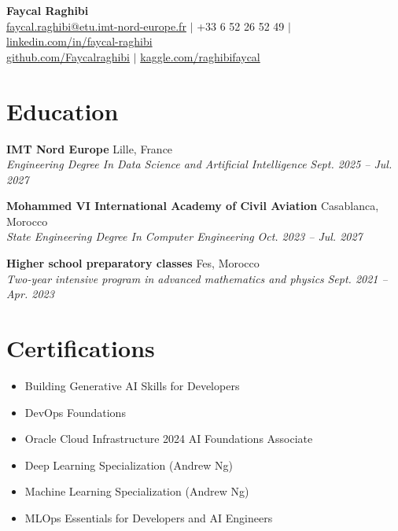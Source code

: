 \documentclass[11pt,a4paper]{article}
\newcommand{\resumeItem}[1]{\item\small{#1}}
\newcommand{\resumeSubheading}[4]{
  \vspace{1pt}
  \noindent\textbf{#1} \hfill #2 \\
  \textit{#3} \hfill \textit{#4}
  \vspace{0pt}
}
\begin{document}
\vspace*{-15mm}
\begin{center}
    {\LARGE \textbf{Faycal Raghibi}} \\

    \href{mailto:faycal.raghibi@etu.imt-nord-europe.fr}{faycal.raghibi@etu.imt-nord-europe.fr} $|$
    +33 6 52 26 52 49 $|$
    \href{https://linkedin.com/in/faycal-raghibi}{linkedin.com/in/faycal-raghibi} \\
    \href{https://github.com/Faycalraghibi}{github.com/Faycalraghibi} $|$
    \href{https://kaggle.com/raghibifaycal}{kaggle.com/raghibifaycal}
\end{center}

\vspace{-10pt}

\section{Education}

\resumeSubheading
{IMT Nord Europe}{Lille, France}
{Engineering Degree In Data Science and Artificial Intelligence}{Sept. 2025 -- Jul. 2027}

\resumeSubheading
{Mohammed VI International Academy of Civil Aviation}{Casablanca, Morocco}
{State Engineering Degree In Computer Engineering}{Oct. 2023 -- Jul. 2027}

\resumeSubheading
{Higher school preparatory classes}{Fes, Morocco}
{Two-year intensive program in advanced mathematics and physics}{Sept. 2021 -- Apr. 2023}

\section{Certifications}

\vspace{-2pt}
\begin{minipage}[t]{0.48\textwidth}
\begin{itemize}
    \resumeItem{Building Generative AI Skills for Developers}
    \resumeItem{DevOps Foundations}
    \resumeItem{Oracle Cloud Infrastructure 2024 AI Foundations Associate}
\end{itemize}
\end{minipage}
\hfill
\begin{minipage}[t]{0.48\textwidth}
\begin{itemize}
    \resumeItem{Deep Learning Specialization (Andrew Ng)}
    \resumeItem{Machine Learning Specialization (Andrew Ng)}
    \resumeItem{MLOps Essentials for Developers and AI Engineers}
\end{itemize}
\end{minipage}
\end{document}
